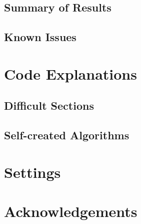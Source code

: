 \subsection{Summary of Results}

\subsection{Known Issues}

\section{Code Explanations}

\subsection{Difficult Sections}

\subsection{Self-created Algorithms}

\section{Settings}

\section{Acknowledgements}

